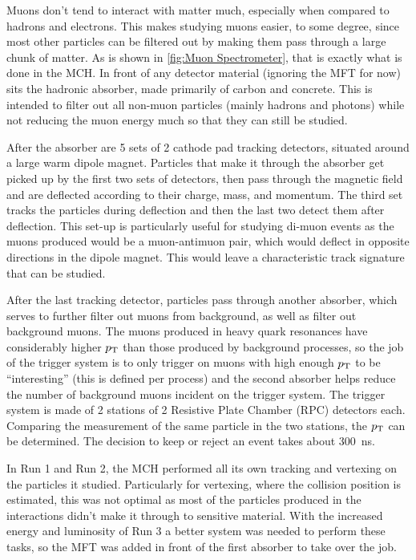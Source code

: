 Muons don't tend to interact with matter much, especially when compared to hadrons and electrons. This makes studying muons easier, to some degree, since most other particles can be filtered out by making them pass through a large chunk of matter. As is shown in \cref{fig:Muon Spectrometer}, that is exactly what is done in the MCH. In front of any detector material (ignoring the MFT for now) sits the hadronic absorber, made primarily of carbon and concrete. This is intended to filter out all non-muon particles (mainly hadrons and photons) while not reducing the muon energy much so that they can still be studied. 

After the absorber are 5 sets of 2 cathode pad tracking detectors, situated around a large warm dipole magnet. Particles that make it through the absorber get picked up by the first two sets of detectors, then pass through the magnetic field and are deflected according to their charge, mass, and momentum. The third set tracks the particles during deflection and then the last two detect them after deflection. This set-up is particularly useful for studying di-muon events as the muons produced would be a muon-antimuon pair, which would deflect in opposite directions in the dipole magnet. This would leave a characteristic track signature that can be studied.

After the last tracking detector, particles pass through another absorber, which serves to further filter out muons from background, as well as filter out background muons. The muons produced in heavy quark resonances have considerably higher $p_\mathrm{T}$ than those produced by background processes, so the job of the trigger system is to only trigger on muons with high enough $p_\mathrm{T}$ to be ``interesting'' (this is defined per process) and the second absorber helps reduce the number of background muons incident on the trigger system. The trigger system is made of 2 stations of 2 Resistive Plate Chamber (RPC) detectors each. Comparing the measurement of the same particle in the two stations, the $p_\mathrm{T}$ can be determined. The decision to keep or reject an event takes about \SI{300}{\nano\second}.

In Run 1 and Run 2, the MCH performed all its own tracking and vertexing on the particles it studied. Particularly for vertexing, where the collision position is estimated, this was not optimal as most of the particles produced in the interactions didn't make it through to sensitive material. With the increased energy and luminosity of Run 3 a better system was needed to perform these tasks, so the MFT was added in front of the first absorber to take over the job.


